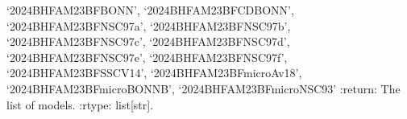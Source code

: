 \documentclass[letterpaper,10pt,english]{sphinxmanual}
\begin{document}
\begin{fulllineitems}
‘2024\sphinxhyphen{}BHF\sphinxhyphen{}AM\sphinxhyphen{}23BF\sphinxhyphen{}BONN’, ‘2024\sphinxhyphen{}BHF\sphinxhyphen{}AM\sphinxhyphen{}23BF\sphinxhyphen{}CDBONN’,     ‘2024\sphinxhyphen{}BHF\sphinxhyphen{}AM\sphinxhyphen{}23BF\sphinxhyphen{}NSC97a’, ‘2024\sphinxhyphen{}BHF\sphinxhyphen{}AM\sphinxhyphen{}23BF\sphinxhyphen{}NSC97b’, ‘2024\sphinxhyphen{}BHF\sphinxhyphen{}AM\sphinxhyphen{}23BF\sphinxhyphen{}NSC97c’, ‘2024\sphinxhyphen{}BHF\sphinxhyphen{}AM\sphinxhyphen{}23BF\sphinxhyphen{}NSC97d’,     ‘2024\sphinxhyphen{}BHF\sphinxhyphen{}AM\sphinxhyphen{}23BF\sphinxhyphen{}NSC97e’, ‘2024\sphinxhyphen{}BHF\sphinxhyphen{}AM\sphinxhyphen{}23BF\sphinxhyphen{}NSC97f’, ‘2024\sphinxhyphen{}BHF\sphinxhyphen{}AM\sphinxhyphen{}23BF\sphinxhyphen{}SSCV14’,    ‘2024\sphinxhyphen{}BHF\sphinxhyphen{}AM\sphinxhyphen{}23BFmicro\sphinxhyphen{}Av18’, ‘2024\sphinxhyphen{}BHF\sphinxhyphen{}AM\sphinxhyphen{}23BFmicro\sphinxhyphen{}BONNB’, ‘2024\sphinxhyphen{}BHF\sphinxhyphen{}AM\sphinxhyphen{}23BFmicro\sphinxhyphen{}NSC93’
:return: The list of models.
:rtype: list{[}str{]}.

\end{fulllineitems}


\begin{fulllineitems}
\label{\detokenize{source/api/setup_micro_matter:nucleardatapy.setup_micro_matter.models_micro_matter_group_NM}}
\pysigstartsignatures
\pysiglinewithargsret
{}
{}
{}
\pysigstopsignatures
\end{fulllineitems}


\begin{fulllineitems}
\label{\detokenize{source/api/setup_micro_matter:nucleardatapy.setup_micro_matter.models_micro_matter_group_SM}}
\pysigstartsignatures
\pysiglinewithargsret
{}
{}
{}
\pysigstopsignatures
\end{fulllineitems}
\end{document}
